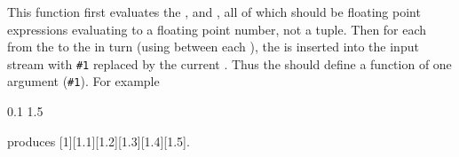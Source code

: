 \documentclass[oneside]{book}
\begin{document}

\begin{function}{\FpStepInline}
\begin{syntax}
    
\end{syntax}
This function first evaluates the , 
and , all of which should be floating point
expressions evaluating to a floating point number, not a tuple.
Then for each  from the  to the
 in turn (using  between each
), the  is inserted into the input stream
with \verb|#1| replaced by the current . Thus the
 should define a function of one argument (\verb|#1|).
For example
\begin{codehigh}
\IgnoreSpacesOn
\TlClear \lTmpaTl
{} {0.1} {1.5} {
  \TlPutRight \lTmpaTl {[#1]}
}
\Result {\Value\lTmpaTl}
\IgnoreSpacesOff
\end{codehigh}
produces [1][1.1][1.2][1.3][1.4][1.5].
\end{function}
\end{document}

